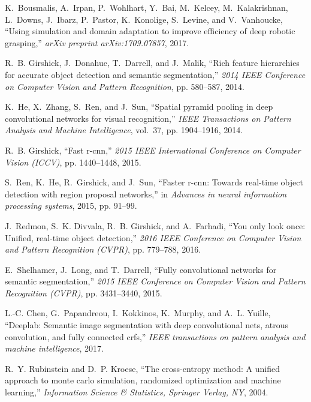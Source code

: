 \documentclass[letterpaper, 10 pt, conference]{ieeeconf}  %
\begin{document}
\begin{thebibliography}{10}
K.~Bousmalis, A.~Irpan, P.~Wohlhart, Y.~Bai, M.~Kelcey, M.~Kalakrishnan,
  L.~Downs, J.~Ibarz, P.~Pastor, K.~Konolige, S.~Levine, and V.~Vanhoucke,
  ``Using simulation and domain adaptation to improve efficiency of deep
  robotic grasping,'' \emph{arXiv preprint arXiv:1709.07857}, 2017.

R.~B. Girshick, J.~Donahue, T.~Darrell, and J.~Malik, ``Rich feature
  hierarchies for accurate object detection and semantic segmentation,''
  \emph{2014 IEEE Conference on Computer Vision and Pattern Recognition}, pp.
  580--587, 2014.

K.~He, X.~Zhang, S.~Ren, and J.~Sun, ``Spatial pyramid pooling in deep
  convolutional networks for visual recognition,'' \emph{IEEE Transactions on
  Pattern Analysis and Machine Intelligence}, vol.~37, pp. 1904--1916, 2014.

R.~B. Girshick, ``Fast r-cnn,'' \emph{2015 IEEE International Conference on
  Computer Vision (ICCV)}, pp. 1440--1448, 2015.

S.~Ren, K.~He, R.~Girshick, and J.~Sun, ``Faster r-cnn: Towards real-time
  object detection with region proposal networks,'' in \emph{Advances in neural
  information processing systems}, 2015, pp. 91--99.

J.~Redmon, S.~K. Divvala, R.~B. Girshick, and A.~Farhadi, ``You only look once:
  Unified, real-time object detection,'' \emph{2016 IEEE Conference on Computer
  Vision and Pattern Recognition (CVPR)}, pp. 779--788, 2016.

E.~Shelhamer, J.~Long, and T.~Darrell, ``Fully convolutional networks for
  semantic segmentation,'' \emph{2015 IEEE Conference on Computer Vision and
  Pattern Recognition (CVPR)}, pp. 3431--3440, 2015.

L.-C. Chen, G.~Papandreou, I.~Kokkinos, K.~Murphy, and A.~L. Yuille, ``Deeplab:
  Semantic image segmentation with deep convolutional nets, atrous convolution,
  and fully connected crfs,'' \emph{IEEE transactions on pattern analysis and
  machine intelligence}, 2017.

R.~Y. Rubinstein and D.~P. Kroese, ``The cross-entropy method: A unified
  approach to monte carlo simulation, randomized optimization and machine
  learning,'' \emph{Information Science \& Statistics, Springer Verlag, NY},
  2004.


\end{thebibliography}
\end{document}
